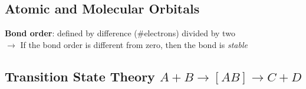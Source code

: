 \subsection{Atomic and Molecular Orbitals}
%
%
\textbf{Bond order}: defined by difference (\#electrons) divided by two\\
$\to$ If the bond order is different from zero, then the bond is \textit{stable}
%
\subsection{Transition State Theory \textnormal{$A+B \to [AB] \to C+D$}}
%
%
\vspace{-1mm}
